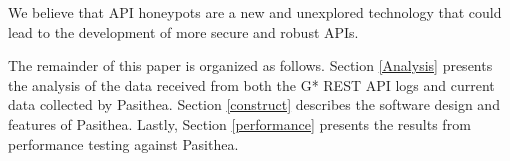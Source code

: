 \documentclass[10pt, conference]{IEEEtran}
\begin{document}
We believe that API honeypots are a new and unexplored technology that could lead to the development of more secure and robust APIs.

The remainder of this paper is organized as follows. Section \ref{Analysis} presents the analysis of the data received from both the G* REST API logs and current data collected by Pasithea. Section \ref{construct} describes the software design and features of Pasithea. Lastly, Section \ref{performance} presents the results from performance testing against Pasithea.




%
%



%
%
\end{document}

